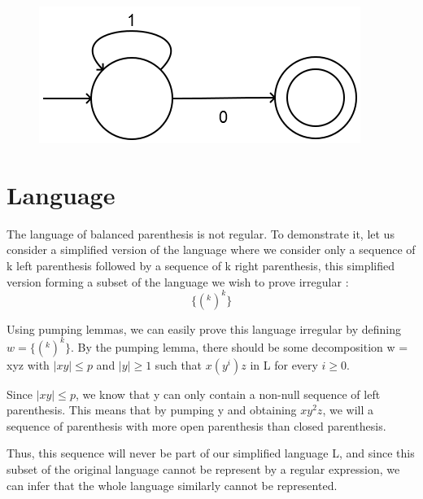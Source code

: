 \documentclass[a4paper, 11pt]{article}
\begin{document}
    	\begin{figure}[!h]
    		\center
    		\includegraphics[scale=0.5]{DFAQ3.png}
    	\end{figure}

    \section{Language}
    	The language of balanced parenthesis is not regular.
    	To demonstrate it, let us consider a simplified version of the language
    	where we consider only a sequence of k left parenthesis followed by
    	a sequence of k right parenthesis, this simplified version forming
    	a subset of the language we wish to prove irregular :
    	\newline
    	$$\{(^k )^k\}$$

    	Using pumping lemmas, we can easily prove this language irregular by defining
    	$w = \{(^k )^k\}$. By the pumping lemma, there should be some decomposition
    	w = xyz with $|xy| \le p$ and $|y| \ge 1$ such that $x(y^i)z$
    	in L for every $i \ge 0$. \newline

    	Since $|xy| \le p$, we know that y can only contain a non-null sequence of
    	left parenthesis. This means that by pumping y and obtaining $xy^2 z$, we will
    	a sequence of parenthesis with more open parenthesis than closed parenthesis.
    	\newline

    	Thus, this sequence will never be part of our simplified language L, and since
    	this subset of the original language cannot be represent by a regular expression,
    	we can infer that the whole language similarly cannot be represented.
\end{document}
